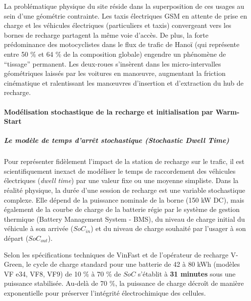 \documentclass[10pt, a4paper]{article}
\begin{document}
La problématique physique du site réside dans la superposition de ces
usages au sein d'une géométrie contrainte. Les taxis électriques GSM en
attente de prise en charge et les véhicules électriques (particuliers et
taxis) convergeant vers les bornes de recharge partagent la même voie
d'accès. De plus, la forte prédominance des motocyclistes dans le flux
de trafic de Hanoï (qui représente entre 50 \% et 64 \% de la
composition globale) engendre un phénomène de ``tissage'' permanent. Les
deux-roues s'insèrent dans les micro-intervalles géométriques laissés
par les voitures en manœuvre, augmentant la friction cinématique et
ralentissant les manœuvres d'insertion et d'extraction du hub de
recharge.

\paragraph{Modélisation stochastique de la recharge et initialisation
par
Warm-Start}\label{moduxe9lisation-stochastique-de-la-recharge-et-initialisation-par-warm-start}

\subparagraph{Le modèle de temps d'arrêt stochastique (Stochastic Dwell
Time)}\label{le-moduxe8le-de-temps-darruxeat-stochastique-stochastic-dwell-time}

Pour représenter fidèlement l'impact de la station de recharge sur le
trafic, il est scientifiquement inexact de modéliser le temps de
raccordement des véhicules électriques (\emph{dwell time}) par une
valeur fixe ou une moyenne simpliste. Dans la réalité physique, la durée
d'une session de recharge est une variable stochastique complexe. Elle
dépend de la puissance nominale de la borne (150 kW DC), mais également
de la courbe de charge de la batterie régie par le système de gestion
thermique (Battery Management System - BMS), du niveau de charge initial
du véhicule à son arrivée (\(SoC_{in}\)) et du niveau de charge souhaité
par l'usager à son départ (\(SoC_{out}\)).

Selon les spécifications techniques de VinFast et de l'opérateur de
recharge V-Green, le cycle de charge standard pour une batterie de 42 à
80 kWh (modèles VF e34, VF8, VF9) de 10 \% à 70 \% de \(SoC\) s'établit
à \textbf{31 minutes} sous une puissance stabilisée. Au-delà de 70 \%,
la puissance de charge décroît de manière exponentielle pour préserver
l'intégrité électrochimique des cellules.
\end{document}
